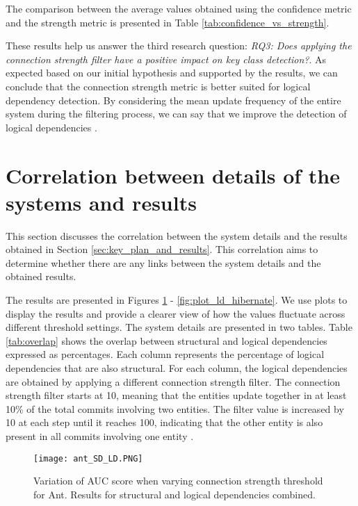The comparison between the average values obtained using the confidence metric and the strength metric is presented in Table \ref{tab:confidence_vs_strength}. 

These results help us answer the third research question: \textit{RQ3: Does applying the connection strength filter have a positive impact on key class detection?}. As expected based on our initial hypothesis and supported by the results, we can conclude that the connection strength metric is better suited for logical dependency detection. By considering the mean update frequency of the entire system during the filtering process, we can say that we improve the detection of logical dependencies \cite{b4}.





\section{Correlation between details of the systems and results}
\label{sec:key_overlapping}

\hspace{4em}This section discusses the correlation between the system details and the results obtained in Section \ref{sec:key_plan_and_results}. This correlation aims to determine whether there are any links between the system details and the obtained results.

The results are presented in Figures \ref{fig:plot_sd_ld_ant} - \ref{fig:plot_ld_hibernate}. We use plots to display the results and provide a clearer view of how the values fluctuate across different threshold settings. The system details are presented in two tables. Table \ref{tab:overlap} shows the overlap between structural and logical dependencies expressed as percentages. Each column represents the percentage of logical dependencies that are also structural. For each column, the logical dependencies are obtained by applying a different connection strength filter. The connection strength filter starts at 10, meaning that the entities update together in at least 10\% of the total commits involving two entities. The filter value is increased by 10 at each step until it reaches 100, indicating that the other entity is also present in all commits involving one entity \cite{b4}.




\begin{figure}
\centering
\texttt{[image: ant\_SD\_LD.PNG]}
\caption{Variation of AUC score when varying connection strength threshold for Ant. Results for structural and logical dependencies combined. }
\label{fig:plot_sd_ld_ant}
\centering
\end{figure}


